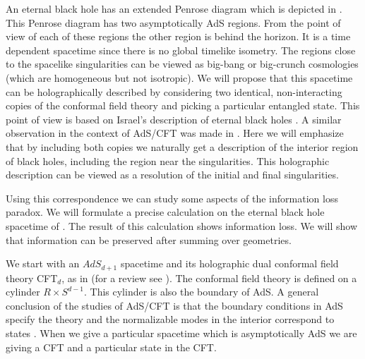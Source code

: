  An eternal black hole has an extended Penrose diagram which is 
depicted in  \penrose .  
 This Penrose diagram has two asymptotically 
AdS regions. From the point of view of each of these regions the other
region is behind the horizon. It   is a  time 
dependent spacetime  since there is no global  timelike isometry. 
The regions close to the spacelike singularities can be viewed 
as big-bang or big-crunch cosmologies (which are homogeneous but
not isotropic). 
 We will  propose that this spacetime
can be holographically described by considering two identical, 
non-interacting copies of the conformal field theory and picking a 
particular entangled state. This point of view is based on 
Israel's description of eternal black holes \israel . 
 A similar observation in the context of AdS/CFT  was made in 
 .  
Here we will emphasize that by including both copies
we naturally get a description of the interior region of black holes, 
including the region near the singularities.
This holographic description can be viewed as a resolution of the 
initial and final singularities. 



Using this correspondence we can study some aspects of the information 
loss paradox. 
 We will formulate a precise calculation
on  the eternal black hole spacetime of  \penrose . The
result of this calculation  shows information loss. We will 
show that  information can be  preserved after summing over geometries. 



We  start with an $AdS_{d+1}$ spacetime  and its holographic dual 
conformal field theory CFT$_d$, as in 
(for a review see \review ).
The conformal field theory is defined on a cylinder $R\times S^{d-1}$.
This cylinder is also the boundary of AdS. 
A general conclusion of the studies of AdS/CFT is that the boundary 
conditions in AdS specify the theory and the  normalizable
modes in the interior correspond to  states .
 When we give a 
particular spacetime which is asymptotically AdS we are giving a CFT and
a particular state in the CFT.  

\ifig{}
{}

